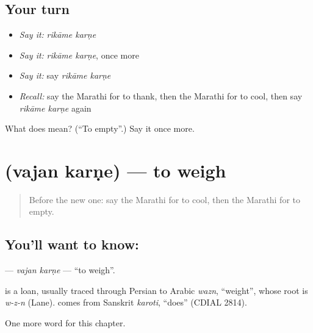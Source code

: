 \subsection*{Your turn}
\begin{itemize}
\raggedright
  \item \emph{Say it:} \emph{rikāme karṇe}
  \item \emph{Say it:} \emph{rikāme karṇe}, once more
  \item \emph{Say it:} say \emph{rikāme karṇe}
  \item \emph{Recall:} say the Marathi for to thank, then the Marathi for to cool, then say \emph{rikāme karṇe} again
\end{itemize}

\begin{tcolorbox}[breakable,colback=teal!4,colframe=teal!35!black,title={Before you move on}]
What does   mean? (\textquotedblleft{}To empty\textquotedblright{}.) Say it once more.
\end{tcolorbox}
\section[\texorpdfstring{\mr{वजन} \mr{करणे} (vajan karṇe)}{वजन करणे (vajan karṇe)}]{  (vajan karṇe) — to weigh}

\label{lesson:MR-C163-vajan-karne}



\begin{quote}
Before the new one: say the Marathi for to cool, then the Marathi for to empty.
\end{quote}

\subsection*{You'll want to know:  }
\textbf{ } — \emph{vajan karṇe} — \textquotedblleft{}to weigh\textquotedblright{}.

\begin{cousinweb}
\textbf{} is a loan, usually traced through Persian to Arabic \emph{wazn}, \textquotedblleft{}weight\textquotedblright{}, whose root is \emph{w-z-n} (Lane). \textbf{} comes from Sanskrit \emph{karoti}, \textquotedblleft{}does\textquotedblright{} (CDIAL 2814).
\end{cousinweb}

\begin{grammarlens}[title={What you've built}]
One more word for this chapter.
\end{grammarlens}

